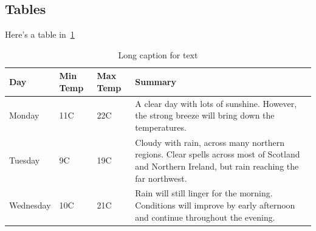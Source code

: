 \subsection{Tables}\label{ssec:tables}

Here's a table in~\cref{tab:table}

\begin{table}
\begin{center}
    \begin{tabular}{ | l | l | l | p{5cm} |}
    \hline
    Day & Min Temp & Max Temp & Summary \\ \hline
    Monday & 11C & 22C & A clear day with lots of sunshine.  
    However, the strong breeze will bring down the temperatures. \\ \hline
    Tuesday & 9C & 19C & Cloudy with rain, across many northern regions. Clear spells 
    across most of Scotland and Northern Ireland, 
    but rain reaching the far northwest. \\ \hline
    Wednesday & 10C & 21C & Rain will still linger for the morning. 
    Conditions will improve by early afternoon and continue 
    throughout the evening. \\
    \hline
    \end{tabular}
    \caption[Short caption for table]{Long caption for text \label{tab:table}}
    \end{center}
\end{table}

